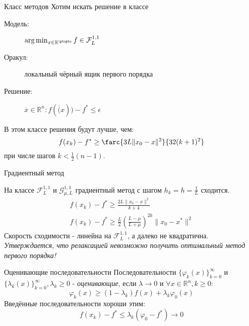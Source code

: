 \documentclass[14pt, fleqn, xcolor={dvipsnames, table}]{beamer}
\begin{document}
\begin{frame}{Класс методов}
Хотим искать решение в классе
\begin{description}
  \item [\color{blue}Модель:] $\arg\min_{x \in \mathbb{R}^{\ptopto}}f \in \mathcal{F}_L^{1,1}$
  \item [\color{blue}Оракул:] локальный чёрный ящик первого порядка
  \item [\color{blue}Решение:] $\overline{x} \in \mathbb{R}^n : f(\overline(x)) - f^* \le \epsilon$
\end{description}
В этом классе решения будут лучше, чем:
$$
f(x_k) - f^* \ge \farc{3L\|x_0-x\|^2}{32(k+1)^2}
$$
при числе шагов $k < \frac{1}{2}(n-1)$.
\end{frame}

\begin{frame}{Градиентный метод}

На классе $\mathcal{F}_L^{1,1}$ и $\mathcal{G}_{\mu, L}^{1,1}$ градиентный метод с шагом $h_k=h=\frac{1}{L}$ сходится.
$$\begin{array}{l}
  f(x_k) - f^* \ge \frac{2L\|x_0-x\|^2}{k+4} \\
  f(x_k) - f^* \ge \frac{L}{2}(\frac{L - \mu}{L + \mu})^{2k}\|x_0 - x^*\|^2
\end{array}$$
Скорость сходимости - линейна на $\mathcal{F}_L^{1,1}$, а далеко не квадратична. \\
\textit{Утверждается, что релаксацией невозможно получить оптимальный метод первого порядка!}
\end{frame}

\begin{frame}{Оценивающие последовательности}
Последовательности $\{\varphi_k(x)\}_{k=0}^{\infty}$ и $\{\lambda_k(x)\}_{k=0}^{\infty}, \lambda_k \ge 0$ - \textit{оценивающие}, если $\lambda \to 0$ и $\forall x \in \mathbb{R}^n, k \ge 0$:
$$
\varphi_k(x) \ge (1- \lambda_k)f(x) + \lambda_k\varphi_0(x)
$$
Введённые последовательности хороши этим:
$$
f(x_k) - f^* \le \lambda_k(\varphi_0 - f^*) \to 0
$$

\end{frame}
\end{document}
